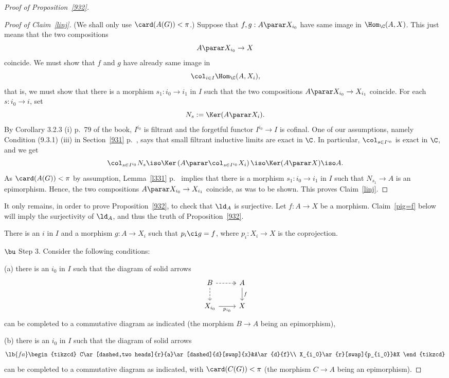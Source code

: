 \documentclass[12pt]{article}
\theoremstyle{remark}
\theoremstyle{definition}
\begin{document}
\begin{proof}[Proof of Proposition~\ref{932}]
\begin{proof}[Proof of Claim~\ref{linj}] 
(We shall only use $\card(A(G))<\pi$.) Suppose that $f,g:A\parar X_{i_0}$ have same image in $\Hom_\C(A,X)$. This just means that the two compositions 
$$
A\parar X_{i_0}\to X
$$ 
coincide. We must show that $f$ and $g$ have already same image in 
$$
\col_{i\in I}\Hom_\C(A,X_i),
$$ 
that is, we must show that there is a morphism $s_1:i_0\to i_1$ in $I$ such that the two compositions $A\parar X_{i_0}\to X_{i_1}$ coincide. For each $s:i_0\to i$, set 
$$
N_s:=\Ker(A\parar X_i).
$$ 
By Corollary 3.2.3 (i) p.~79 of the book, $I^{i_0}$ is filtrant and the forgetful functor $I^{i_0}\to I$ is cofinal. One of our assumptions, namely Condition (9.3.1) (iii) in Section~\ref{931} p.~, says that small filtrant inductive limits are exact in $\C$. In particular, $\col_{s\in I^{i_0}}$ is exact in $\C$, and we get  
$$
\col_{s\in I^{i_0}}N_s\iso\Ker\left(A\parar\col_{s\in I^{i_0}}X_i\right)\iso\Ker(A\parar X)\iso A. 
$$ 
As $\card(A(G))<\pi$ by assumption, Lemma~\ref{l331} p.~ implies that there is a morphism $s_1:i_0\to i_1$ in $I$ such that $N_{s_1}\to A$ is an epimorphism. Hence, the two compositions $A\parar X_{i_0}\to X_{i_1}$ coincide, as was to be shown. This proves Claim~\ref{linj}. 
\end{proof} 

It only remains, in order to prove Proposition~\ref{932}, to check that $\ld_A$ is surjective. Let $f:A\to X$ be a morphism. Claim~\ref{pig=f} below will imply the surjectivity of $\ld_A$, and thus the truth of Proposition~\ref{932}. 

\begin{claim} 
There is an $i$ in $I$ and a morphism $g:A\to X_i$ such that $p_i\ci g=f$, where $p_i:X_i\to X$ is the coprojection.
\end{claim} 

\nn$\bu$ Step 3. Consider the following conditions: 

\nn(a) there is an $i_0$ in $I$ such that the diagram of solid arrows 
$$
\begin{tikzcd}
B\ar[dashed,two heads]{r}\ar[dashed]{d}&A\ar{d}{f}\\ 
X_{i_0}\ar{r}[swap]{p_{i_0}}&X
\end{tikzcd}
$$
can be completed to a commutative diagram as indicated (the morphism $B\to A$ being an epimorphism),

\nn(b) there is an $i_0$ in $I$ such that the diagram of solid arrows 
\begin{equation}\lb{fa}
\begin{tikzcd}
C\ar[dashed,two heads]{r}{a}\ar[dashed]{d}[swap]{x}&A\ar{d}{f}\\ 
X_{i_0}\ar{r}[swap]{p_{i_0}}&X
\end{tikzcd}
\end{equation} 
can be completed to a commutative diagram as indicated, with $\card(C(G))<\pi$ (the morphism $C\to A$ being an epimorphism).


\end{proof}
\end{document}
